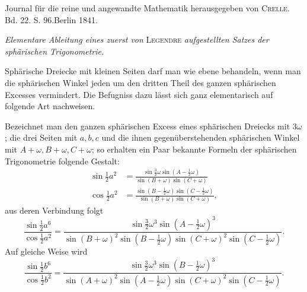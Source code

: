 \clearpage
{}
\begin{center}Journal für die reine und angewandte Mathematik herausgegeben von \textsc{Crelle}.\\
Bd. 22. S. 96.\quad Berlin 1841.\end{center}
\begin{center}\textit{Elementare Ableitung eines zuerst von} \textsc{Legendre} \textit{aufgestellten Satzes der sphärischen Trigonometrie.}\end{center}
\noindent\hspace*{1.2em}Sphärische Dreiecke mit kleinen Seiten darf man wie ebene behandeln, wenn man die sphärischen Winkel jeden um den dritten Theil des ganzen sphärischen Excesses vermindert. Die Befugniss dazu lässt sich ganz elementarisch auf folgende Art nachweisen.

Bezeichnet man den ganzen sphärischen Excess eines sphärischen Dreiecks mit $3\omega$; die drei Seiten mit $a,b,c$ und die ihnen gegenüberstehenden sphärischen Winkel mit $A+\omega,B+\omega,C+\omega$; so erhalten ein Paar bekannte Formeln der sphärischen Trigonometrie folgende Gestalt:
\[
\begin{aligned}
\sin\tfrac12 a^2&=\frac{\sin\tfrac32\omega\sin(A-\tfrac12\omega)}{\sin(B+\omega)\sin(C+\omega)}\\[5pt]
\cos\tfrac12 a^2&=\frac{\sin(B-\tfrac12\omega)\sin(C-\tfrac12\omega)}{\sin(B+\omega)\sin(C+\omega)},
\end{aligned}
\]
\noindent aus deren Verbindung folgt
\[
\frac{\sin\tfrac12 a^6}{\cos\tfrac12 a^2}
=\frac{\sin\tfrac32\omega^3\sin(A-\tfrac12\omega)^3}
{\sin(B+\omega)^2\sin(B-\tfrac12\omega)\sin(C+\omega)^2\sin(C-\tfrac12\omega)}.
\]
\noindent Auf gleiche Weise wird
\[
\frac{\sin\tfrac12 b^6}{\cos\tfrac12 b^2}
=\frac{\sin\tfrac32\omega^3\sin(B-\tfrac12\omega)^3}
{\sin(A+\omega)^2\sin(A-\tfrac12\omega)\sin(C+\omega)^2\sin(C-\tfrac12\omega)}.
\]

